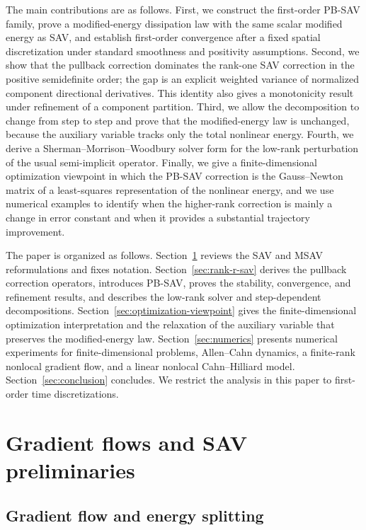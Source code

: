 \documentclass[10pt,onefignum,onetabnum,hidelinks]{siamart251216}
\begin{document}
The main contributions are as follows.  First, we construct the first-order PB-SAV family, prove a modified-energy dissipation law with the same scalar modified energy as SAV, and establish first-order convergence after a fixed spatial discretization under standard smoothness and positivity assumptions.  Second, we show that the pullback correction dominates the rank-one SAV correction in the positive semidefinite order; the gap is an explicit weighted variance of normalized component directional derivatives.  This identity also gives a monotonicity result under refinement of a component partition.  Third, we allow the decomposition to change from step to step and prove that the modified-energy law is unchanged, because the auxiliary variable tracks only the total nonlinear energy.  Fourth, we derive a Sherman--Morrison--Woodbury solver form for the low-rank perturbation of the usual semi-implicit operator.  Finally, we give a finite-dimensional optimization viewpoint in which the PB-SAV correction is the Gauss--Newton matrix of a least-squares representation of the nonlinear energy, and we use numerical examples to identify when the higher-rank correction is mainly a change in error constant and when it provides a substantial trajectory improvement.

The paper is organized as follows.  Section~\ref{sec:sav-msav} reviews the SAV and MSAV reformulations and fixes notation.  Section~\ref{sec:rank-r-sav} derives the pullback correction operators, introduces PB-SAV, proves the stability, convergence, and refinement results, and describes the low-rank solver and step-dependent decompositions.  Section~\ref{sec:optimization-viewpoint} gives the finite-dimensional optimization interpretation and the relaxation of the auxiliary variable that preserves the modified-energy law.  Section~\ref{sec:numerics} presents numerical experiments for finite-dimensional problems, Allen--Cahn dynamics, a finite-rank nonlocal gradient flow, and a linear nonlocal Cahn--Hilliard model.  Section~\ref{sec:conclusion} concludes.  We restrict the analysis in this paper to first-order time discretizations.

\section{Gradient flows and SAV preliminaries}
\label{sec:sav-msav}

\subsection{Gradient flow and energy splitting}
\label{subsec:gradient-flow-splitting}
\end{document}
